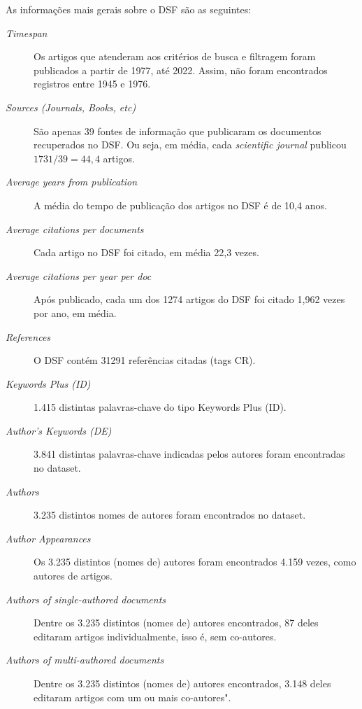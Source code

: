 As informações mais gerais sobre o DSF são as seguintes:
\begin{description}
    \item [\textit{Timespan}] Os artigos que atenderam aos critérios de busca e filtragem foram publicados a partir de 1977, até 2022. Assim, não foram encontrados registros entre 1945 e 1976.
    
    \item [\textit{Sources (Journals, Books, etc)}] São apenas 39 fontes de informação que publicaram os documentos recuperados no DSF. Ou seja, em média, cada \textit{scientific journal} publicou $1731/39=44,4$ artigos. 
    
    \item [\textit{Average years from publication}] A média do tempo de publicação dos artigos no DSF  é de 10,4 anos.
    
    \item [\textit{Average citations per documents}] Cada artigo no DSF foi citado, em média 22,3 vezes.
    
    \item [\textit{Average citations per year per doc}] Após publicado, cada um dos 1274 artigos do DSF  foi citado 1,962 vezes por ano, em média.
    \item [\textit{References}] O DSF contém 31291 referências citadas (tags CR).
    
    \item [\textit{Keywords Plus (ID)}] 1.415 distintas palavras-chave do tipo Keywords Plus (ID).
    
    \item [\textit{Author's Keywords (DE)}] 3.841 distintas palavras-chave indicadas pelos autores foram encontradas no dataset.
    
    \item [\textit{Authors}] 3.235 distintos nomes de autores foram encontrados no dataset.
    
    \item [\textit{Author Appearances}] Os 3.235 distintos (nomes de) autores foram encontrados 4.159 vezes, como autores de artigos.
    
    \item [\textit{Authors of single-authored documents}] Dentre os 3.235 distintos (nomes de) autores encontrados, 87 deles editaram artigos individualmente, isso é, sem co-autores.
    
    \item [\textit{Authors of multi-authored documents}] Dentre os 3.235 distintos (nomes de) autores encontrados, 3.148 deles editaram artigos com um ou mais co-autores".
    

\end{description}
